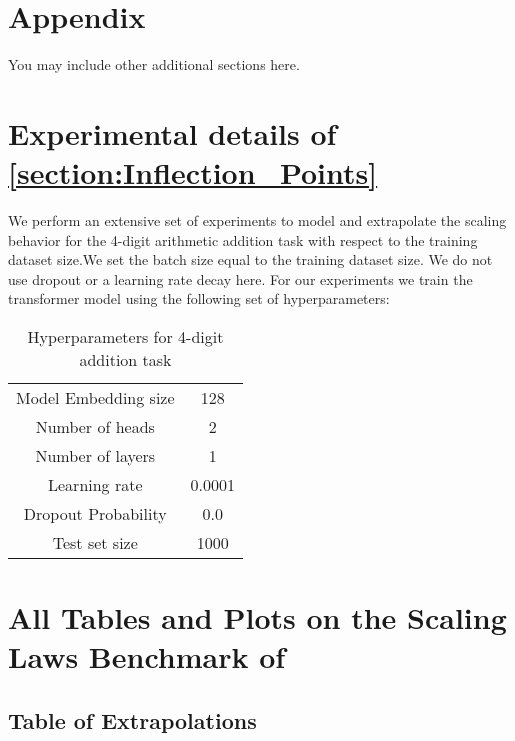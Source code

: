 \section{Appendix}
You may include other additional sections here.

\section{Experimental details of \ref{section:Inflection_Points}}
We perform an extensive set of experiments to model and extrapolate the scaling behavior for the 4-digit arithmetic addition task with respect to the training dataset size.We set the batch size equal to the training dataset size. We do not use dropout or a learning rate decay here. For our experiments we train the transformer model using the following set of hyperparameters:
\begin{table}[hbt!]
    \centering
    \begin{tabular}{c|c}
         Model Embedding size & 128 \\
         Number of heads & 2 \\
         Number of layers & 1 \\
         Learning rate & 0.0001\\
         Dropout Probability & 0.0\\
         Test set size & 1000\\
    \end{tabular}
    \caption{Hyperparameters for 4-digit addition task}
    \label{tab:my_label}
\end{table}

\section{All Tables and Plots on the Scaling Laws Benchmark of \citet{Alabdulmohsi2022revisiting}}
\label{all_scaling_laws}

\subsection{Table of Extrapolations}

\FloatBarrier

